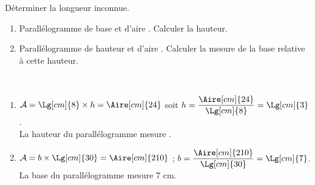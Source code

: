 \begin{exercice*}
   Déterminer la longueur inconnue.
   \begin{enumerate}
      \item Parallélogramme de base  et d'aire . Calculer la hauteur.
      \item Parallélogramme de hauteur  et d'aire . Calculer la mesure de la base relative à cette hauteur.
   \end{enumerate}
\end{exercice*}
\begin{corrige}
   \ \\ [-5mm]
   \begin{enumerate}
      \item $\mathcal{A} =\Lg[cm]{8}\times h =\Aire[cm]{24}$ soit $h =\dfrac{\Aire[cm]{24}}{\Lg[cm]{8}} =\Lg[cm]{3}$. \\ [1mm]
         La {\color{red} hauteur} du parallélogramme mesure {\color{red} }. \smallskip
      \item $\mathcal{A} =b\times\Lg[cm]{30} =\Aire[cm]{210}$ ; $b =\dfrac{\Aire[cm]{210}}{\Lg[cm]{30}} =\Lg[cm]{7}$. \\ [1mm]
      La {\color{red} base} du parallélogramme mesure {\color{red} 7 cm}.
   \end{enumerate}
\end{corrige}
